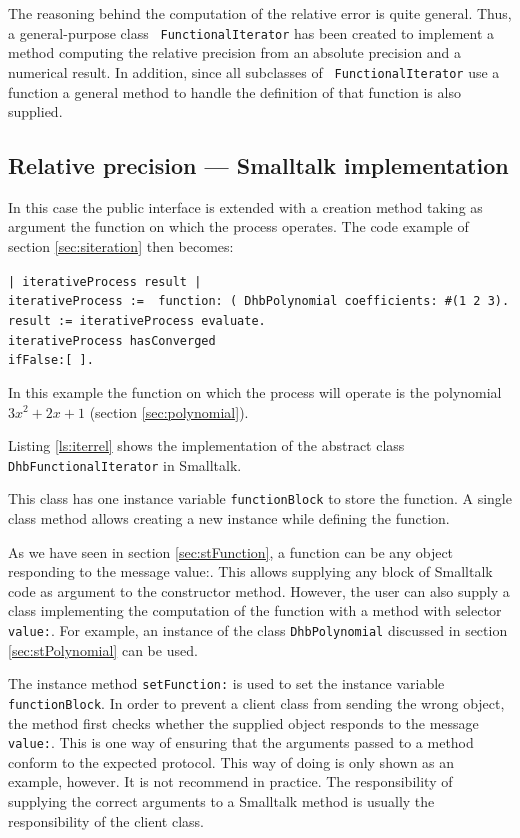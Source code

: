 \documentclass[twoside]{book}
\begin{document}
The reasoning behind the computation of the relative error is
quite general. Thus, a general-purpose class {\tt
FunctionalIterator} has been created to implement a method
computing the relative precision from an absolute precision and a
numerical result. In addition, since all subclasses of {\tt
FunctionalIterator} use a function a general method to handle the
definition of that function is also supplied.

\subsection{Relative precision --- Smalltalk  implementation}
\label{sec:siterrel} In this case the public interface is extended
with a creation method taking as argument the function on which
the process operates. The code example of section
\ref{sec:siteration} then becomes:
\begin{codeExample}\break
 {\tt | iterativeProcess result |\\
 iterativeProcess := {\sl <a subclass of DhbFunctionalIterator>}
 function:
( DhbPolynomial coefficients: \#(1 2 3).\\ result :=
iterativeProcess evaluate.\\ iterativeProcess hasConverged\\
\hspace{4 em} ifFalse:[ {\sl <special case processing>}].
 }
\end{codeExample}
In this example the function on which the process will operate is
the polynomial $3x^2+2x+1$ (\cf section \ref{sec:polynomial}).

Listing \ref{ls:iterrel} shows the implementation of the abstract
class {\tt DhbFunctionalIterator} in Smalltalk.

This class has one instance variable {\tt functionBlock} to store
the function. A single class method allows creating a new instance
while defining the function.

As we have seen in section \ref{sec:stFunction}, a function can be
any object responding to the message value:. This allows supplying
any block of Smalltalk code as argument to the constructor method.
However, the user can also supply a class implementing the
computation of the function with a method with selector {\tt
value:}. For example, an instance of the class {\tt DhbPolynomial}
discussed in section \ref{sec:stPolynomial} can be used.

The instance method {\tt setFunction:} is used to set the instance
variable {\tt functionBlock}. In order to prevent a client class
from sending the wrong object, the method first checks whether the
supplied object responds to the message {\tt value:}. This is one
way of ensuring that the arguments passed to a method conform to
the expected protocol. This way of doing is only shown as an
example, however. It is not recommend in practice. The
responsibility of supplying the correct arguments to a Smalltalk
method is usually the responsibility of the client class.
\end{document}
